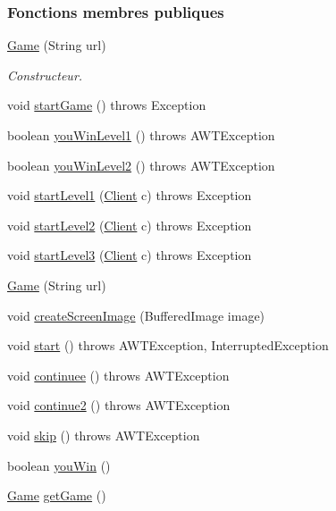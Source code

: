 \subsubsection*{Fonctions membres publiques}
\begin{DoxyCompactItemize}
\item 
\hyperlink{classSuchi_1_1Game_a552ba6ea99b0ac919c41cf7f866b9a75}{Game} (String url)
\begin{DoxyCompactList}\small\item\em Constructeur. \end{DoxyCompactList}\item 
void \hyperlink{classSuchi_1_1Game_abee3ad7bb5a48f2a1f8d653698feb5f6}{start\+Game} ()  throws Exception
\item 
boolean \hyperlink{classSuchi_1_1Game_a297ea3b6be73823136d0bf3610e7c1ac}{you\+Win\+Level1} ()  throws A\+W\+T\+Exception
\item 
boolean \hyperlink{classSuchi_1_1Game_ab2d524572b556014055a7d4169001841}{you\+Win\+Level2} ()  throws A\+W\+T\+Exception
\item 
void \hyperlink{classSuchi_1_1Game_aeddc35c515b0d76f030efdbe1beb82db}{start\+Level1} (\hyperlink{classSuchi_1_1Client}{Client} c)  throws Exception
\item 
void \hyperlink{classSuchi_1_1Game_a8158842b22cc4e8c17e6b4085d9b5665}{start\+Level2} (\hyperlink{classSuchi_1_1Client}{Client} c)  throws Exception
\item 
void \hyperlink{classSuchi_1_1Game_a143479f6385bb267c7ee6059d80624fb}{start\+Level3} (\hyperlink{classSuchi_1_1Client}{Client} c)  throws Exception
\item 
\hyperlink{classSuchi_1_1Game_a552ba6ea99b0ac919c41cf7f866b9a75}{Game} (String url)
\item 
void \hyperlink{classSuchi_1_1Game_ad0a068c884bd0e250e92fb421c1c0763}{create\+Screen\+Image} (Buffered\+Image image)
\item 
void \hyperlink{classSuchi_1_1Game_ac7626fe6860eb60c2991524534d969dd}{start} ()  throws A\+W\+T\+Exception, Interrupted\+Exception
\item 
void \hyperlink{classSuchi_1_1Game_ad59775ca365f2a0e732be88411eaa255}{continuee} ()  throws A\+W\+T\+Exception
\item 
void \hyperlink{classSuchi_1_1Game_a0683a178cefd9d35a0eea5e4bbeeae78}{continue2} ()  throws A\+W\+T\+Exception
\item 
void \hyperlink{classSuchi_1_1Game_a12cde13afba4bf934886ce65fdc82b48}{skip} ()  throws A\+W\+T\+Exception
\item 
boolean \hyperlink{classSuchi_1_1Game_a3f4b5cfd1b51a2859cd9f51798d6966b}{you\+Win} ()
\item 
\hyperlink{classSuchi_1_1Game}{Game} \hyperlink{classSuchi_1_1Game_aea29c2bb6d69690cb5ff393473de8a9f}{get\+Game} ()
\end{DoxyCompactItemize}
